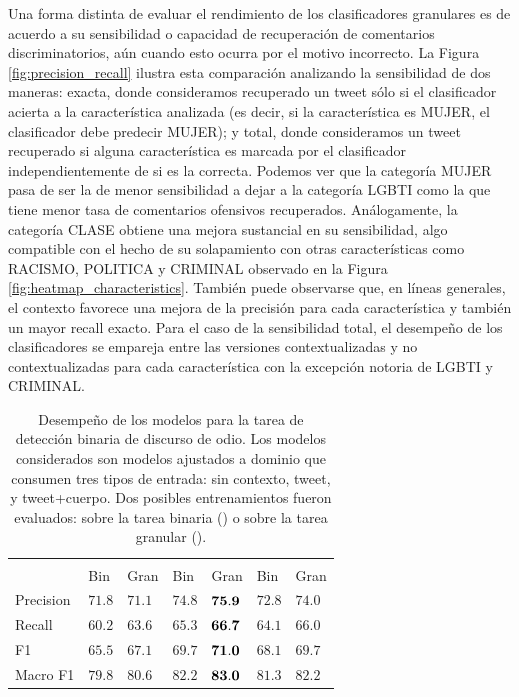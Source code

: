Una forma distinta de evaluar el rendimiento de los clasificadores granulares es de acuerdo a su sensibilidad o capacidad de recuperación de comentarios discriminatorios, aún cuando esto ocurra por el motivo incorrecto. La Figura \ref{fig:precision_recall} ilustra esta comparación analizando la sensibilidad de dos maneras: exacta, donde consideramos recuperado un tweet sólo si el clasificador acierta a la característica analizada (es decir, si la característica es MUJER, el clasificador debe predecir MUJER); y total, donde consideramos un tweet recuperado si alguna característica es marcada por el clasificador independientemente de si es la correcta. Podemos ver que la categoría MUJER pasa de ser la de menor sensibilidad a dejar a la categoría LGBTI como la que tiene menor tasa de comentarios ofensivos recuperados. Análogamente, la categoría CLASE obtiene una mejora sustancial en su sensibilidad, algo compatible con el hecho de su solapamiento con otras características como RACISMO, POLITICA y CRIMINAL observado en la Figura \ref{fig:heatmap_characteristics}. También puede observarse que, en líneas generales, el contexto favorece una mejora de la precisión para cada característica y también un mayor recall exacto. Para el caso de la sensibilidad total, el desempeño de los clasificadores se empareja entre las versiones contextualizadas y no contextualizadas para cada característica con la excepción notoria de LGBTI y CRIMINAL.

\begin{table}[hb!]
    \centering
    \begin{tabular}{l P{0.10\textwidth}P{0.10\textwidth} P{0.10\textwidth}P{0.10\textwidth}  P{0.10\textwidth}P{0.10\textwidth}}
                  &&           &      \\
                  & Bin   &    Gran         & Bin   &    Gran     & Bin  &   Gran     \\
        \hline
        Precision &  $71.8$ &  $71.1$       &  $74.8$& $\mathbf{75.9}$ & $72.8$ & $74.0$ \\
        Recall    &  $60.2$ &  $63.6$       &  $65.3$& $\mathbf{66.7}$ & $64.1$ & $66.0$ \\
        F1        &  $65.5$ &  $67.1$       &  $69.7$& $\mathbf{71.0}$ & $68.1$ & $69.7$ \\
        Macro F1  &  $79.8$ &  $80.6$       &  $82.2$& $\mathbf{83.0}$ & $81.3$ & $82.2$ \\
        \hline
        \end{tabular}
    \caption{Desempeño de los modelos para la tarea de detección binaria de discurso de odio. Los modelos considerados son modelos \beto{} ajustados a dominio que consumen tres tipos de entrada: sin contexto, tweet, y tweet+cuerpo. Dos posibles entrenamientos fueron evaluados: sobre la tarea binaria () o sobre la tarea granular ().}
    \label{tab:plain_vs_granular_hate_detection}
\end{table}


